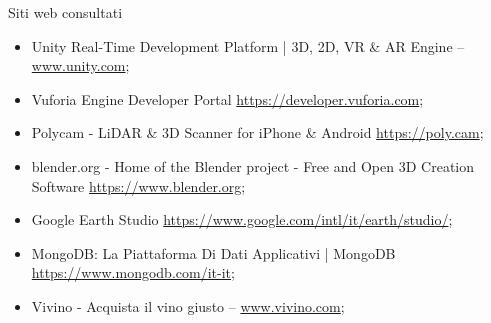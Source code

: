 \cleardoublepage
{}
{}
\nocite{*}


%

\vspace{4cm}
\begin{Large}Siti web consultati\end{Large}
\begin{itemize}
    \item Unity Real-Time Development Platform | 3D, 2D, VR \& AR Engine -- \url{www.unity.com};
    \item Vuforia Engine Developer Portal \url{https://developer.vuforia.com};
    \item Polycam - LiDAR \& 3D Scanner for iPhone \& Android \url{https://poly.cam};
    \item blender.org - Home of the Blender project - Free and Open 3D Creation Software \url{https://www.blender.org};
    \item Google Earth Studio \url{https://www.google.com/intl/it/earth/studio/};
    \item MongoDB: La Piattaforma Di Dati Applicativi | MongoDB \url{https://www.mongodb.com/it-it};
    \item Vivino - Acquista il vino giusto -- \url{www.vivino.com};
\end{itemize}

